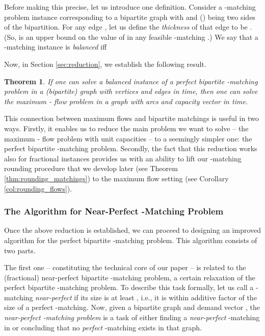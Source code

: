 \documentclass[11pt, letterpaper]{article}
\newtheorem{theorem}{Theorem}[section]
\begin{document}
Before making this precise, let us introduce one definition. Consider a -matching problem instance corresponding to a bipartite graph  with  and  () being two sides of the bipartition. For any edge , let us define the {\em thickness}  of that edge to be . (So,  is an upper bound on the value of  in any feasible -matching .) We say that a -matching instance is {\em balanced} iff 


Now, in Section \ref{sec:reduction}, we establish the following result.

\begin{theorem}\label{thm:flow_to_matchings}
If one can solve a balanced instance of a perfect bipartite -matching problem in a (bipartite) graph with   vertices and  edges in  time, then one can solve the maximum - flow problem in a graph  with  arcs and capacity vector  in  time. 
\end{theorem}

This connection between maximum flows and bipartite matchings is useful in two ways. Firstly, it enables us to reduce the main problem we want to solve -- the maximum - flow problem with unit capacities -- to a seemingly simpler one: the perfect bipartite -matching problem. Secondly, the fact that this reduction works also for fractional instances provides us with an ability to lift our -matching rounding procedure that we develop later (see Theorem \ref{thm:rounding_matchings}) to the maximum flow setting (see Corollary \ref{col:rounding_flows}). 


\subsubsection*{The Algorithm for Near-Perfect -Matching Problem}

Once the above reduction is established, we can proceed to designing an improved algorithm for the perfect bipartite -matching problem. This algorithm consists of two parts. 

The first one -- constituting the technical core of our paper -- is related to the (fractional) near-perfect bipartite -matching problem, a certain relaxation of the perfect bipartite -matching problem. To describe this task formally, let us call a -matching   {\em near-perfect} if its size  is at least , i.e., it is within  additive factor of the size of a perfect -matching. Now, given a bipartite graph  and demand vector , the {\em near-perfect -matching problem} is a task of either finding a {\em near-perfect} -matching in  or concluding that no {\em perfect} -matching exists in that graph.
\end{document}
